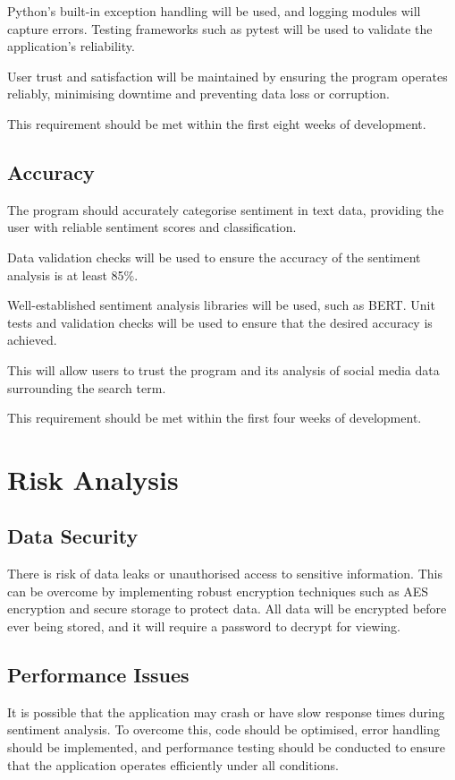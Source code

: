     Python's built-in exception handling will be used, and logging modules will capture errors. Testing frameworks such as pytest will be used to validate the application's reliability.

    User trust and satisfaction will be maintained by ensuring the program operates reliably, minimising downtime and preventing data loss or corruption.

    This requirement should be met within the first eight weeks of development.

    \subsection{Accuracy}
    The program should accurately categorise sentiment in text data, providing the user with reliable sentiment scores and classification.

    Data validation checks will be used to ensure the accuracy of the sentiment analysis is at least 85\%.

    Well-established sentiment analysis libraries will be used, such as BERT. Unit tests and validation checks will be used to ensure that the desired accuracy is achieved.

    This will allow users to trust the program and its analysis of social media data surrounding the search term.

    This requirement should be met within the first four weeks of development.

\section{Risk Analysis}

    \subsection{Data Security}
    There is risk of data leaks or unauthorised access to sensitive information. This can be overcome by implementing robust encryption techniques such as AES encryption and secure storage to protect data. All data will be encrypted before ever being stored, and it will require a password to decrypt for viewing.

    \subsection{Performance Issues}
    It is possible that the application may crash or have slow response times during sentiment analysis. To overcome this, code should be optimised, error handling should be implemented, and performance testing should be conducted to ensure that the application operates efficiently under all conditions.

